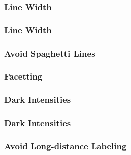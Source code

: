 \documentclass[12pt]{beamer}\usepackage[]{graphicx}\usepackage[]{color}
\begin{document}

\begin{frame}
\frametitle{Line Width}
\begin{center}
\end{center}
\end{frame}


\begin{frame}
\frametitle{Line Width}
\begin{center}
\end{center}
\end{frame}


\begin{frame}
\frametitle{Avoid Spaghetti Lines}
\begin{center}
\end{center}
\end{frame}


\begin{frame}
\frametitle{Facetting}
\begin{center}
\end{center}
\end{frame}


\begin{frame}
\frametitle{Dark Intensities}
\begin{center}
\end{center}
\end{frame}


\begin{frame}
\frametitle{Dark Intensities}
\begin{center}
\end{center}
\end{frame}


\begin{frame}
\frametitle{Avoid Long-distance Labeling}
\begin{center}
\end{center}
\end{frame}
\end{document}
